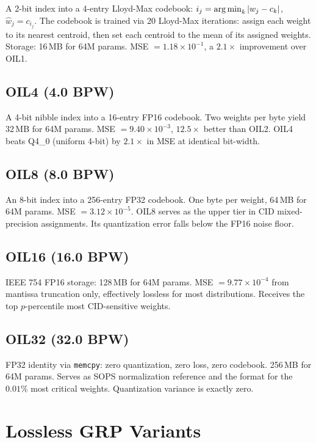 A 2-bit index into a 4-entry Lloyd-Max codebook:
$i_j = \argmin_k |w_j - c_k|$, $\hat{w}_j = c_{i_j}$. The codebook is
trained via 20 Lloyd-Max iterations: assign each weight to its nearest
centroid, then set each centroid to the mean of its assigned weights.
Storage: 16\,MB for 64M params. MSE $= 1.18 \times 10^{-1}$, a
$2.1\times$ improvement over OIL1.

\subsection{OIL4 (4.0 BPW)}

A 4-bit nibble index into a 16-entry FP16 codebook. Two weights per
byte yield 32\,MB for 64M params. MSE $= 9.40 \times 10^{-3}$,
$12.5\times$ better than OIL2. OIL4 beats Q4\_0 (uniform 4-bit) by
$2.1\times$ in MSE at identical bit-width.

\subsection{OIL8 (8.0 BPW)}

An 8-bit index into a 256-entry FP32 codebook. One byte per weight,
64\,MB for 64M params. MSE $= 3.12 \times 10^{-5}$. OIL8 serves as
the upper tier in CID mixed-precision assignments. Its quantization
error falls below the FP16 noise floor.

\subsection{OIL16 (16.0 BPW)}

IEEE 754 FP16 storage: 128\,MB for 64M params.
MSE $= 9.77 \times 10^{-4}$ from mantissa truncation only,
effectively lossless for most distributions. Receives the top
$p$-percentile most CID-sensitive weights.

\subsection{OIL32 (32.0 BPW)}

FP32 identity via \texttt{memcpy}: zero quantization, zero loss, zero
codebook. 256\,MB for 64M params. Serves as SOPS normalization
reference and the format for the $0.01\%$ most critical weights.
Quantization variance is exactly zero.

\section{Lossless GRP Variants}
\label{sec:grp_variants}

